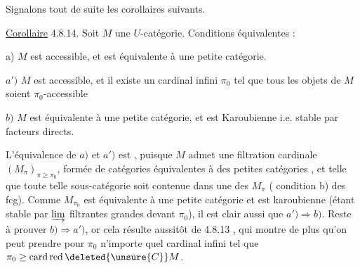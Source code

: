 
Signalons tout de suite les corollaires suivants.

\uline{Corollaire} 4.8.14. Soit $M$ une $U$-catégorie. Conditions équivalentes :


a) $M$ est accessible, et est équivalente à une petite catégorie.

$a')$ $M$ est accessible, et il existe un cardinal infini $\pi_0$ tel que tous les objets de $M$ soient $\pi_0$-accessible \deleted{[De plus, si $\pi_0$ est \unsure{fi}} 

 $b)$ $M$ est équivalente à une petite catégorie, et est Karoubienne i.e. stable par facteurs directs.


L'équivalence de $a)$ et $a')$ est , puisque $M$ admet une filtration cardinale  $(M_{\pi})_{\pi\geq\pi_0}$, formée de  catégories équivalentes à des petites catégories , et telle que toute telle sous-catégorie soit contenue dans une des $M_{\pi}$ ( condition b) des fcg). Comme $M_{\pi_0}$ est équivalente à une petite catégorie et est karoubienne (étant stable par $\varinjlim$ filtrantes grandes devant $\pi_0$), il est clair aussi que $a')\Longrightarrow b)$. Reste à prouver $b)\Longrightarrow a')$, or  cela résulte aussitôt de 4.8.13 , qui montre de plus qu'on peut prendre pour $\pi_0$ n'importe quel cardinal infini tel que $\pi_0\geq\operatorname{card}\operatorname{red}\deleted{\unsure{C}} M$.
